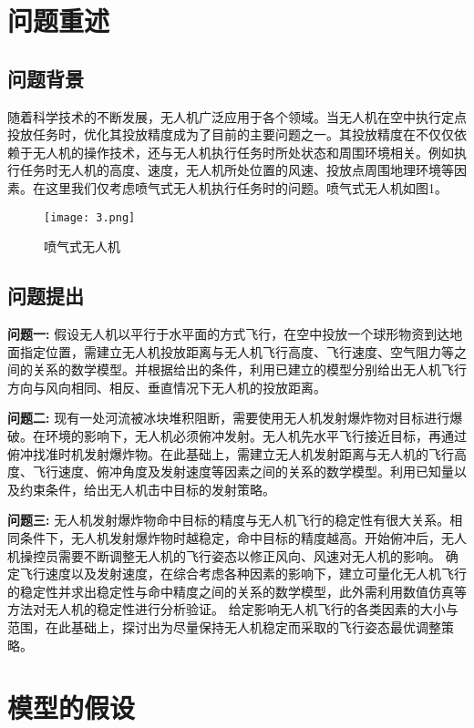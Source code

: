 \documentclass[normalsize]{ctexart}
\begin{document}
	\newpage
	
	
	\section{问题重述}
	\subsection{问题背景}
	随着科学技术的不断发展，无人机广泛应用于各个领域。当无人机在空中执行定点投放任务时，优化其投放精度成为了目前的主要问题之一。其投放精度在不仅仅依赖于无人机的操作技术，还与无人机执行任务时所处状态和周围环境相关。例如执行任务时无人机的高度、速度，无人机所处位置的风速、投放点周围地理环境等因素。在这里我们仅考虑喷气式无人机执行任务时的问题。喷气式无人机如图1。
	\begin{figure}[h]
		
		\centering
		\texttt{[image: 3.png]}
		\caption{喷气式无人机}
		
	\end{figure}
	\subsection{问题提出}
	
	\noindent\textbf{问题一:}
	假设无人机以平行于水平面的方式飞行，在空中投放一个球形物资到达地面指定位置，需建立无人机投放距离与无人机飞行高度、飞行速度、空气阻力等之间的关系的数学模型。并根据给出的条件，利用已建立的模型分别给出无人机飞行方向与风向相同、相反、垂直情况下无人机的投放距离。
	\par
	\noindent\textbf{问题二:}
	现有一处河流被冰块堆积阻断，需要使用无人机发射爆炸物对目标进行爆破。在环境的影响下，无人机必须俯冲发射。无人机先水平飞行接近目标，再通过俯冲找准时机发射爆炸物。在此基础上，需建立无人机发射距离与无人机的飞行高度、飞行速度、俯冲角度及发射速度等因素之间的关系的数学模型。利用已知量以及约束条件，给出无人机击中目标的发射策略。
	\par
	\noindent\textbf{问题三:}
	无人机发射爆炸物命中目标的精度与无人机飞行的稳定性有很大关系。相同条件下，无人机发射爆炸物时越稳定，命中目标的精度越高。开始俯冲后，无人机操控员需要不断调整无人机的飞行姿态以修正风向、风速对无人机的影响。 确定飞行速度以及发射速度，在综合考虑各种因素的影响下，建立可量化无人机飞行的稳定性并求出稳定性与命中精度之间的关系的数学模型，此外需利用数值仿真等方法对无人机的稳定性进行分析验证。
	给定影响无人机飞行的各类因素的大小与范围，在此基础上，探讨出为尽量保持无人机稳定而采取的飞行姿态最优调整策略。
	\section{模型的假设}
	
\end{document}
